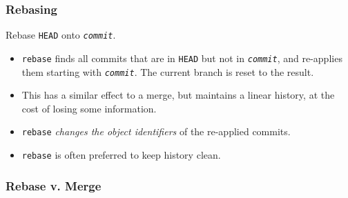 \documentclass{beamer}
\begin{document}
\begin{frame}
  \frametitle{Rebasing}
  \begin{description}
  \item[\texttt{git rebase \textit{commit}}] Rebase \texttt{HEAD} onto
    \texttt{\textit{commit}}.
  \end{description}

  \begin{itemize}
  \item \texttt{rebase} finds all commits that are in \texttt{HEAD}
    but not in \texttt{\textit{commit}}, and re-applies them starting
    with \texttt{\textit{commit}}. The current branch is reset to the
    result.
  \item This has a similar effect to a merge, but maintains a linear
    history, at the cost of losing some information.
  \item \texttt{rebase} \emph{changes the object identifiers} of the
    re-applied commits.
  \item \texttt{rebase} is often preferred to keep history clean.
  \end{itemize}
\end{frame}

\begin{frame}
  \frametitle{Rebase v. Merge}
  \begin{itemize}
  \end{itemize}
    \begin{center}
  \end{center}
\end{frame}
\end{document}
